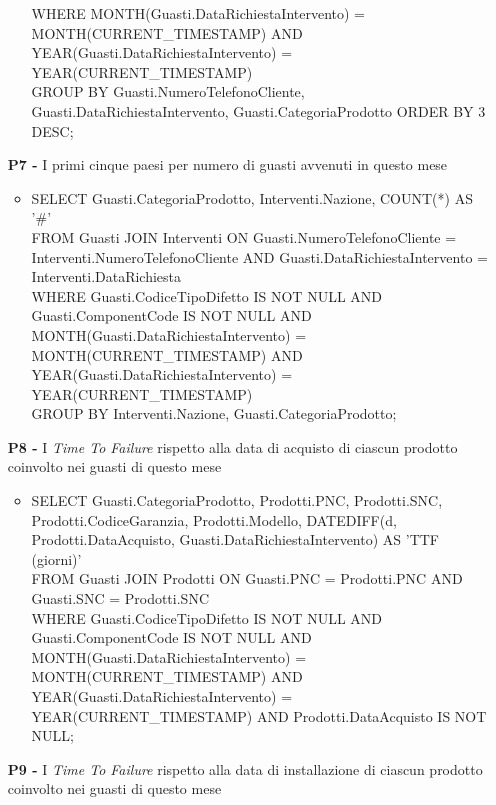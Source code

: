 \documentclass[a4paper, 12pt]{report}
\begin{document}
\begin{itemize}
\begin{itemize}[leftmargin=*, topsep=0pt]
			WHERE MONTH(Guasti.DataRichiestaIntervento) = MONTH(CURRENT\_TIMESTAMP) AND YEAR(Guasti.DataRichiestaIntervento) = YEAR(CURRENT\_TIMESTAMP)\\
			GROUP BY Guasti.NumeroTelefonoCliente, Guasti.DataRichiestaIntervento, Guasti.CategoriaProdotto ORDER BY 3 DESC;
		\end{itemize}
	\newpage
	\item[\textbf{P7 -}] I primi cinque paesi per numero di guasti avvenuti in questo mese
		\begin{itemize}[leftmargin=*, topsep=0pt]
			\item SELECT Guasti.CategoriaProdotto, Interventi.Nazione, COUNT(*) AS '\#'\\
			FROM Guasti JOIN Interventi ON Guasti.NumeroTelefonoCliente = Interventi.NumeroTelefonoCliente AND Guasti.DataRichiestaIntervento = Interventi.DataRichiesta\\
			WHERE Guasti.CodiceTipoDifetto IS NOT NULL AND Guasti.ComponentCode IS NOT NULL AND MONTH(Guasti.DataRichiestaIntervento) = \\MONTH(CURRENT\_TIMESTAMP) AND YEAR(Guasti.DataRichiestaIntervento) = YEAR(CURRENT\_TIMESTAMP)\\
			GROUP BY Interventi.Nazione, Guasti.CategoriaProdotto;
		\end{itemize}
	\item[\textbf{P8 -}] I \textit{Time To Failure} rispetto alla data di acquisto di ciascun prodotto coinvolto nei guasti di questo mese
		\begin{itemize}[leftmargin=*, topsep=0pt]
			\item SELECT Guasti.CategoriaProdotto, Prodotti.PNC, Prodotti.SNC, Prodotti.CodiceGaranzia, Prodotti.Modello, DATEDIFF(d, Prodotti.DataAcquisto, Guasti.DataRichiestaIntervento) AS 'TTF (giorni)'\\
			FROM Guasti JOIN Prodotti ON Guasti.PNC = Prodotti.PNC AND Guasti.SNC = Prodotti.SNC\\
			WHERE Guasti.CodiceTipoDifetto IS NOT NULL AND Guasti.ComponentCode IS NOT NULL AND MONTH(Guasti.DataRichiestaIntervento) = \\MONTH(CURRENT\_TIMESTAMP) AND YEAR(Guasti.DataRichiestaIntervento) = YEAR(CURRENT\_TIMESTAMP) AND Prodotti.DataAcquisto IS NOT NULL;
		\end{itemize}
	\item[\textbf{P9 -}] I \textit{Time To Failure} rispetto alla data di installazione di ciascun prodotto coinvolto nei guasti di questo mese
		\begin{itemize}[leftmargin=*, topsep=0pt]

\end{itemize}
\end{itemize}
\end{document}
